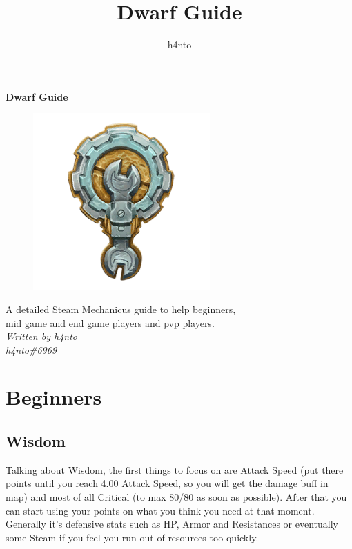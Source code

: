\documentclass[14pt]{article}
\title{Dwarf Guide}
\author{h4nto}
\begin{document}

\begin{center}
    \vspace*{\fill}
    \Huge\textbf{Dwarf Guide} \\
    \begin{figure}[h]
        \includegraphics{dwarf.png}
        \centering
    \end{figure}
    \vspace*{\fill}
    \normalsize{A detailed Steam Mechanicus guide to help beginners,\\mid game and end game players and pvp players.} \\
    \vspace*{\fill}
    \Large\textsl{Written by h4nto} \\
    \Large\textsl{h4nto\#6969}
    \vspace*{\fill}
\end{center}

\newpage


\tableofcontents

\newpage

\section{Beginners}

\subsection{Wisdom}
Talking about Wisdom, the first things to focus on are Attack Speed (put there points until you reach 4.00 Attack Speed, so you will get the damage buff in map) and most of all Critical (to max 80/80 as soon as possible).
After that you can start using your points on what you think you need at that moment.
Generally it's defensive stats such as HP, Armor and Resistances or eventually some Steam if you feel you run out of resources too quickly.
\end{document}
